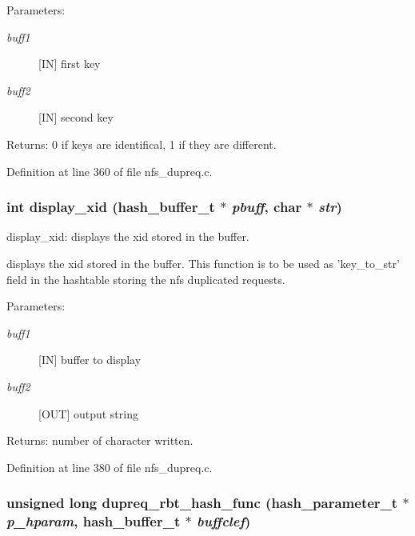 \begin{Desc}
\item[Parameters:]
\begin{description}
\item[{\em buff1}][IN] first key \item[{\em buff2}][IN] second key\end{description}
\end{Desc}
\begin{Desc}
\item[Returns:]0 if keys are identifical, 1 if they are different. \end{Desc}


Definition at line 360 of file nfs\_\-dupreq.c.
\subsubsection{\setlength{\rightskip}{0pt plus 5cm}int display\_\-xid (hash\_\-buffer\_\-t $\ast$ {\em pbuff}, char $\ast$ {\em str})}\label{nfs__dupreq_8c_a13}


display\_\-xid: displays the xid stored in the buffer.

displays the xid stored in the buffer. This function is to be used as 'key\_\-to\_\-str' field in the hashtable storing the nfs duplicated requests.

\begin{Desc}
\item[Parameters:]
\begin{description}
\item[{\em buff1}][IN] buffer to display \item[{\em buff2}][OUT] output string\end{description}
\end{Desc}
\begin{Desc}
\item[Returns:]number of character written. \end{Desc}


Definition at line 380 of file nfs\_\-dupreq.c.
\subsubsection{\setlength{\rightskip}{0pt plus 5cm}unsigned long dupreq\_\-rbt\_\-hash\_\-func (hash\_\-parameter\_\-t $\ast$ {\em p\_\-hparam}, hash\_\-buffer\_\-t $\ast$ {\em buffclef})}\label{nfs__dupreq_8c_a11}


